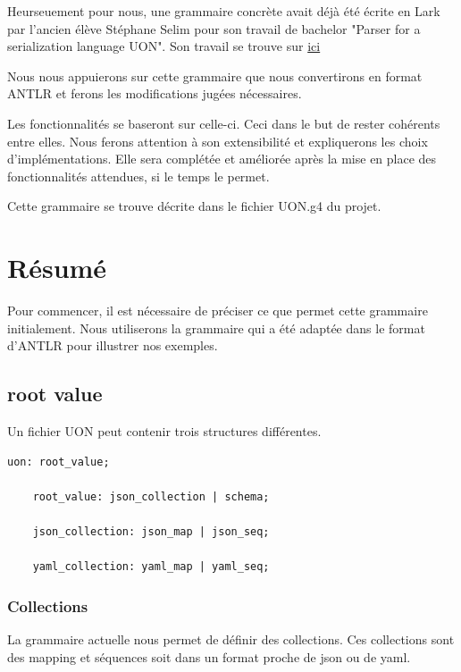 \documentclass[
    iict, %
    il, %
]{heig-tb}
\begin{document}
Heurseuement pour nous, une grammaire concrète avait déjà été écrite en Lark par l'ancien élève Stéphane Selim pour son travail de bachelor "Parser for a serialization language UON".
Son travail se trouve sur \href{https://github.com/uon-language/uon-parser}{ici}

Nous nous appuierons sur cette grammaire que nous convertirons en format ANTLR et ferons les modifications jugées nécessaires.

Les fonctionnalités se baseront sur celle-ci. Ceci dans le but de rester cohérents entre elles.
Nous ferons attention à son extensibilité et expliquerons les choix d'implémentations.
Elle sera complétée et améliorée après la mise en place des fonctionnalités attendues, si le temps le permet.

Cette grammaire se trouve décrite dans le fichier UON.g4 du projet.

\section{Résumé}
Pour commencer, il est nécessaire de préciser ce que permet cette grammaire initialement.
Nous utiliserons la grammaire qui a été adaptée dans le format d'ANTLR pour illustrer nos exemples.


\subsection{root value}

Un fichier UON peut contenir trois structures différentes.

\begin{lstlisting}[frame=single,caption={uon-root-value},label={uon-root-value}]
    uon: root_value;

    root_value: json_collection | schema;

    json_collection: json_map | json_seq;

    yaml_collection: yaml_map | yaml_seq;
\end{lstlisting}

\subsubsection{Collections}
La grammaire actuelle nous permet de définir des collections. Ces collections sont des mapping et séquences soit dans un format proche de json ou de yaml.
\end{document}
